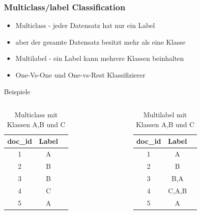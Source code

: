 \documentclass[12pt, xcolor=table]{beamer}
\begin{document}
\begin{frame}
    \frametitle{Multiclass/label Classification}
    \begin{itemize}
    \item Multiclass - jeder Datensatz hat nur ein Label
        \item aber der gesamte Datensatz besitzt mehr als eine Klasse
        \item Multilabel - ein Label kann mehrere Klassen beinhalten
        \item One-Vs-One und One-vs-Rest Klassifizierer
    \end{itemize}
    \begin{block}{Beispiele}
    \begin{columns}
    \begin{table}
        \begin{tabular}{ccc}
            \tiny\textbf{doc\_id} &\tiny \textbf{Label}  \\
            \hline
            \tiny 1 &\tiny A  \\
            \tiny 2 &\tiny B  \\
            \tiny 3 &\tiny B  \\
            \tiny 4 &\tiny C  \\
            \tiny 5 &\tiny A  \\
        \end{tabular}
         \caption*{Multiclass mit Klassen A,B und C}
    \end{table}
    \begin{table}
        \begin{tabular}{ccc}
            \tiny\textbf{doc\_id} &\tiny \textbf{Label}  \\
            \hline
            \tiny 1 &\tiny A  \\
            \tiny 2 &\tiny B  \\
            \tiny 3 &\tiny B,A  \\
            \tiny 4 &\tiny C,A,B  \\
            \tiny 5 &\tiny A  \\
        \end{tabular}
         \caption*{Multilabel mit Klassen A,B und C}
    \end{table}
    \end{columns}
    \end{block}
\end{frame}
\end{document}
